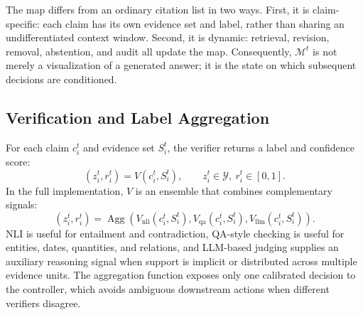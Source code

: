The map differs from an ordinary citation list in two ways. First, it is claim-specific: each claim has its own evidence set and label, rather than sharing an undifferentiated context window. Second, it is dynamic: retrieval, revision, removal, abstention, and audit all update the map. Consequently, $\mathcal{M}^{t}$ is not merely a visualization of a generated answer; it is the state on which subsequent decisions are conditioned.

\subsection{Verification and Label Aggregation}
\label{subsec:framework_verification}

For each claim $c_i^{t}$ and evidence set $S_i^{t}$, the verifier returns a label and confidence score:
\begin{equation}
    (z_i^{t},r_i^{t}) = V(c_i^{t},S_i^{t}),
    \qquad z_i^{t}\in\mathcal{Y},\ r_i^{t}\in[0,1].
    \label{eq:framework_verify}
\end{equation}
In the full implementation, $V$ is an ensemble that combines complementary signals:
\begin{equation}
    (z_i^{t},r_i^{t})
    =
    \operatorname{Agg}
    \left(
    V_{\mathrm{nli}}(c_i^{t},S_i^{t}),
    V_{\mathrm{qa}}(c_i^{t},S_i^{t}),
    V_{\mathrm{llm}}(c_i^{t},S_i^{t})
    \right).
    \label{eq:framework_agg}
\end{equation}
NLI is useful for entailment and contradiction, QA-style checking is useful for entities, dates, quantities, and relations, and LLM-based judging supplies an auxiliary reasoning signal when support is implicit or distributed across multiple evidence units. The aggregation function exposes only one calibrated decision to the controller, which avoids ambiguous downstream actions when different verifiers disagree.

